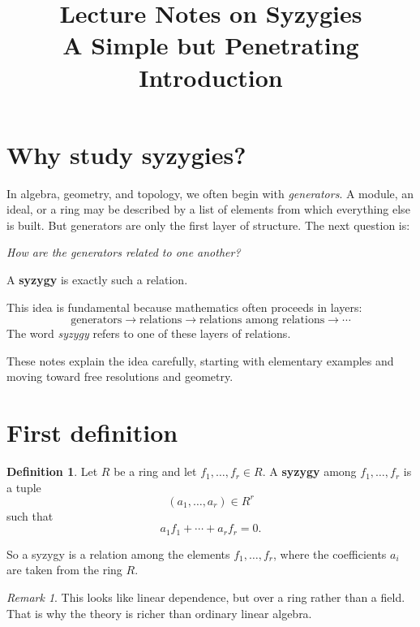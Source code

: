 \documentclass[11pt]{article}
\title{Lecture Notes on Syzygies\\
	\large A Simple but Penetrating Introduction}
\author{}
\date{}
\theoremstyle{definition}
\newtheorem{definition}[theorem]{Definition}
\theoremstyle{remark}
\newtheorem{remark}[theorem]{Remark}
\begin{document}
	
	\maketitle
	
	\tableofcontents
	
	\section{Why study syzygies?}
	
	In algebra, geometry, and topology, we often begin with \emph{generators}. A module, an ideal, or a ring may be described by a list of elements from which everything else is built. But generators are only the first layer of structure. The next question is:
	
	\begin{center}
		\emph{How are the generators related to one another?}
	\end{center}
	
	A \textbf{syzygy} is exactly such a relation.
	
	This idea is fundamental because mathematics often proceeds in layers:
	\[
	\text{generators} \longrightarrow \text{relations} \longrightarrow \text{relations among relations} \longrightarrow \cdots
	\]
	The word \emph{syzygy} refers to one of these layers of relations.
	
	These notes explain the idea carefully, starting with elementary examples and moving toward free resolutions and geometry.
	
	\section{First definition}
	
	\begin{definition}
		Let \(R\) be a ring and let \(f_1,\dots,f_r \in R\). A \textbf{syzygy} among \(f_1,\dots,f_r\) is a tuple
		\[
		(a_1,\dots,a_r)\in R^r
		\]
		such that
		\[
		a_1f_1+\cdots+a_rf_r=0.
		\]
	\end{definition}
	
	So a syzygy is a relation among the elements \(f_1,\dots,f_r\), where the coefficients \(a_i\) are taken from the ring \(R\).
	
	\begin{remark}
		This looks like linear dependence, but over a ring rather than a field. That is why the theory is richer than ordinary linear algebra.
	\end{remark}
	
\end{document}
